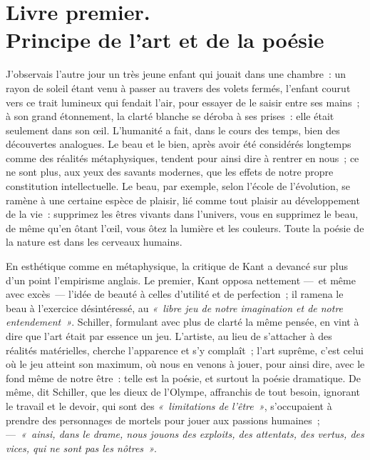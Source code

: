 \documentclass[french,twoside]{book} %
\begin{document}
\section[{Livre premier. Principe de l’art et de la poésie}]{Livre premier. \\
Principe de l’art et de la poésie}\renewcommand{\leftmark}{Livre premier. \\
Principe de l’art et de la poésie}

\noindent  J’observais l’autre jour un très jeune enfant qui jouait dans une chambre : un rayon de soleil étant venu à passer au travers des volets fermés, l’enfant courut vers ce trait lumineux qui fendait l’air, pour essayer de le saisir entre ses mains ; à son grand étonnement, la clarté blanche se déroba à ses prises : elle était seulement dans son œil. L’humanité a fait, dans le cours des temps, bien des découvertes analogues. Le beau et le bien, après avoir été considérés longtemps comme des réalités métaphysiques, tendent pour ainsi dire à rentrer en nous ; ce ne sont plus, aux yeux des savants modernes, que les effets de notre propre constitution intellectuelle. Le beau, par exemple, selon l’école de l’évolution, se ramène à une certaine espèce de plaisir, lié comme tout plaisir au développement de la vie : supprimez les êtres vivants dans l’univers, vous en supprimez le beau, de même qu’en ôtant l’œil, vous  ôtez la lumière et les couleurs. Toute la poésie de la nature est dans les cerveaux humains.\par
En esthétique comme en métaphysique, la critique de Kant a devancé sur plus d’un point l’empirisme anglais. Le premier, Kant opposa nettement — et même avec excès — l’idée de beauté à celles d’utilité et de perfection ; il ramena le beau à l’exercice désintéressé, au \emph{« libre jeu de notre imagination et de notre entendement »}. Schiller, formulant avec plus de clarté la même pensée, en vint à dire que l’art était par essence un jeu. L’artiste, au lieu de s’attacher à des réalités matérielles, cherche l’apparence et s’y complaît ; l’art suprême, c’est celui où le jeu atteint son maximum, où nous en venons à jouer, pour ainsi dire, avec le fond même de notre être : telle est la poésie, et surtout la poésie dramatique. De même, dit Schiller, que les dieux de l’Olympe, affranchis de tout besoin, ignorant le travail et le devoir, qui sont des \emph{« limitations de l’être »}, s’occupaient à prendre des personnages de mortels pour jouer aux passions humaines ; — \emph{« ainsi, dans le drame, nous jouons des exploits, des attentats, des vertus, des vices, qui ne sont pas les nôtres »}.\par
\end{document}
